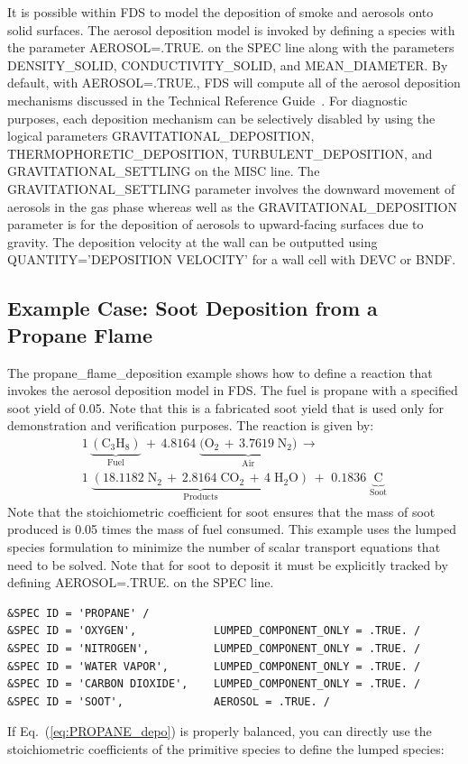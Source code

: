 \documentclass[11pt]{book}
\begin{document}
It is possible within FDS to model the deposition of smoke and aerosols onto solid surfaces. The aerosol deposition model is invoked by defining a species with the parameter {\ct AEROSOL=.TRUE.} on the {\ct SPEC} line along with the parameters {\ct DENSITY\_SOLID}, {\ct CONDUCTIVITY\_SOLID}, and {\ct MEAN\_DIAMETER}. By default, with {\ct AEROSOL=.TRUE.}, FDS will compute all of the aerosol deposition mechanisms discussed in the Technical Reference Guide~\cite{FDS_Math_Guide}. For diagnostic purposes, each deposition mechanism can be selectively disabled by using the logical parameters {\ct GRAVITATIONAL\_DEPOSITION}, {\ct THERMOPHORETIC\_DEPOSITION}, {\ct TURBULENT\_DEPOSITION}, and {\ct GRAVITATIONAL\_SETTLING} on the {\ct MISC} line. The {\ct GRAVITATIONAL\_SETTLING} parameter involves the downward movement of aerosols in the gas phase whereas well as the {\ct GRAVITATIONAL\_DEPOSITION} parameter is for the deposition of aerosols to upward-facing surfaces due to gravity.  The deposition velocity at the wall can be outputted using {\ct QUANTITY='DEPOSITION VELOCITY'} for a wall cell with {\ct DEVC} or {\ct BNDF}.

\subsection{Example Case: Soot Deposition from a Propane Flame}

The {\ct propane\_flame\_deposition} example shows how to define a reaction that invokes the aerosol deposition model in FDS. The fuel is propane with a specified soot yield of 0.05. Note that this is a fabricated soot yield that is used only for demonstration and verification purposes. The reaction is given by:
\begin{multline}\label{eq:PROPANE_depo}
1\,\underbrace{\mathrm{(C_3H_8)}}_\text{Fuel} \,+\, 4.8164 \; \underbrace{\mathrm{(O_2\,+\, 3.7619 \; N_2})}_\text{Air} \, \longrightarrow \\
1 \; \underbrace{\mathrm{(18.1182 \; N_2 \, + \, 2.8164 \; CO_2 \,+ \, 4\; H_2O)}}_\text{Products} \,+\,
\,0.1836 \; \underbrace{\mathrm{C}}_\text{Soot}
\end{multline}
Note that the stoichiometric coefficient for soot ensures that the mass of soot produced is 0.05 times the mass of fuel consumed. This example uses the lumped species formulation to minimize the number of scalar transport equations that need to be solved. Note that for soot to deposit it must be explicitly tracked by defining {\ct AEROSOL=.TRUE.} on the {\ct SPEC} line.
\begin{lstlisting}
&SPEC ID = 'PROPANE' /
&SPEC ID = 'OXYGEN',            LUMPED_COMPONENT_ONLY = .TRUE. /
&SPEC ID = 'NITROGEN',          LUMPED_COMPONENT_ONLY = .TRUE. /
&SPEC ID = 'WATER VAPOR',       LUMPED_COMPONENT_ONLY = .TRUE. /
&SPEC ID = 'CARBON DIOXIDE',    LUMPED_COMPONENT_ONLY = .TRUE. /
&SPEC ID = 'SOOT',              AEROSOL = .TRUE. /
\end{lstlisting}
If Eq.~(\ref{eq:PROPANE_depo}) is properly balanced, you can directly use the stoichiometric coefficients of the primitive species to define the lumped species:
\end{document}
